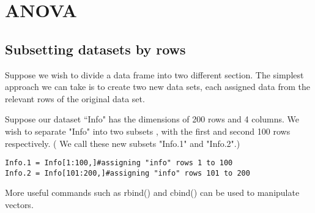 \section{ANOVA}








\subsection{Subsetting datasets by rows}

Suppose we wish to divide a data frame into two different section. The simplest approach we can take is to create two new data sets, each assigned data from the relevant rows of the original data set.

Suppose our dataset ``Info" has the dimensions of 200 rows and 4 columns. We wish to separate "Info" into two subsets , with the first and second 100 rows respectively. ( We call these new subsets "Info.1" and "Info.2".)
\begin{verbatim}
Info.1 = Info[1:100,]#assigning "info" rows 1 to 100
Info.2 = Info[101:200,]#assigning "info" rows 101 to 200
\end{verbatim}

More useful commands such as rbind() and cbind()  can be used to manipulate vectors.

